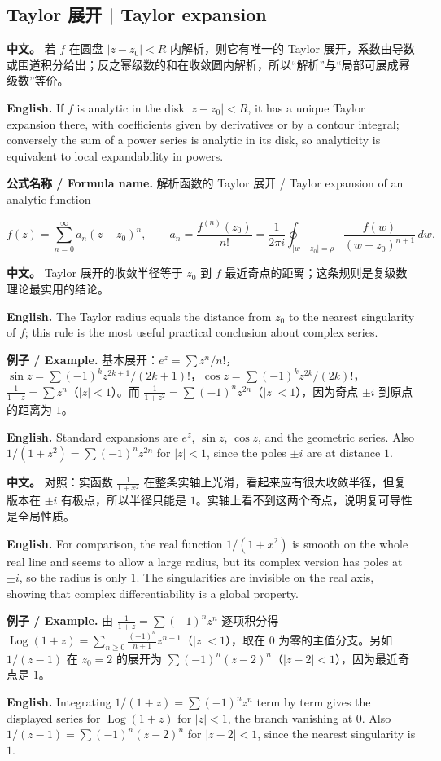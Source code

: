 \documentclass[UTF8,11pt,a4paper]{ctexart}
\newcommand{\EN}[1]{\par\noindent \textbf{English.} #1\par}
\newcommand{\FORMULA}[2]{\par\noindent\textbf{公式名称 / Formula name.} #1 / #2\par}
\newcommand{\EX}[2]{\par\noindent \textbf{例子 / Example.} #1\par\EN{#2}}
\newcommand{\APS}[2]{\par\noindent\textbf{中文。} #1\par\noindent\textbf{English.} #2\par\smallskip}
\begin{document}
\subsection{Taylor 展开 | Taylor expansion}
\APS{若 $f$ 在圆盘 $|z-z_0|<R$ 内解析，则它有唯一的 Taylor 展开，系数由导数或围道积分给出；反之幂级数的和在收敛圆内解析，所以“解析”与“局部可展成幂级数”等价。}{If $f$ is analytic in the disk $|z-z_0|<R$, it has a unique Taylor expansion there, with coefficients given by derivatives or by a contour integral; conversely the sum of a power series is analytic in its disk, so analyticity is equivalent to local expandability in powers.}
\FORMULA{解析函数的 Taylor 展开}{Taylor expansion of an analytic function}
\[
f(z)=\sum_{n=0}^{\infty}a_n(z-z_0)^n,\qquad
a_n=\frac{f^{(n)}(z_0)}{n!}=\frac1{2\pi i}\oint_{|w-z_0|=\rho}\frac{f(w)}{(w-z_0)^{n+1}}\,dw.
\]
\APS{Taylor 展开的收敛半径等于 $z_0$ 到 $f$ 最近奇点的距离；这条规则是复级数理论最实用的结论。}{The Taylor radius equals the distance from $z_0$ to the nearest singularity of $f$; this rule is the most useful practical conclusion about complex series.}
\EX{基本展开：$e^z=\sum z^n/n!$，$\sin z=\sum(-1)^kz^{2k+1}/(2k+1)!$，$\cos z=\sum(-1)^kz^{2k}/(2k)!$，$\frac1{1-z}=\sum z^n$（$|z|<1$）。而 $\frac1{1+z^2}=\sum(-1)^nz^{2n}$（$|z|<1$），因为奇点 $\pm i$ 到原点的距离为 $1$。}{Standard expansions are $e^z$, $\sin z$, $\cos z$, and the geometric series. Also $1/(1+z^2)=\sum(-1)^nz^{2n}$ for $|z|<1$, since the poles $\pm i$ are at distance $1$.}
\APS{对照：实函数 $\frac1{1+x^2}$ 在整条实轴上光滑，看起来应有很大收敛半径，但复版本在 $\pm i$ 有极点，所以半径只能是 $1$。实轴上看不到这两个奇点，说明复可导性是全局性质。}{For comparison, the real function $1/(1+x^2)$ is smooth on the whole real line and seems to allow a large radius, but its complex version has poles at $\pm i$, so the radius is only $1$. The singularities are invisible on the real axis, showing that complex differentiability is a global property.}
\EX{由 $\frac1{1+z}=\sum(-1)^nz^n$ 逐项积分得 $\operatorname{Log}(1+z)=\sum_{n\ge0}\frac{(-1)^n}{n+1}z^{n+1}$（$|z|<1$），取在 $0$ 为零的主值分支。另如 $1/(z-1)$ 在 $z_0=2$ 的展开为 $\sum(-1)^n(z-2)^n$（$|z-2|<1$），因为最近奇点是 $1$。}{Integrating $1/(1+z)=\sum(-1)^nz^n$ term by term gives the displayed series for $\operatorname{Log}(1+z)$ for $|z|<1$, the branch vanishing at $0$. Also $1/(z-1)=\sum(-1)^n(z-2)^n$ for $|z-2|<1$, since the nearest singularity is $1$.}
\end{document}
